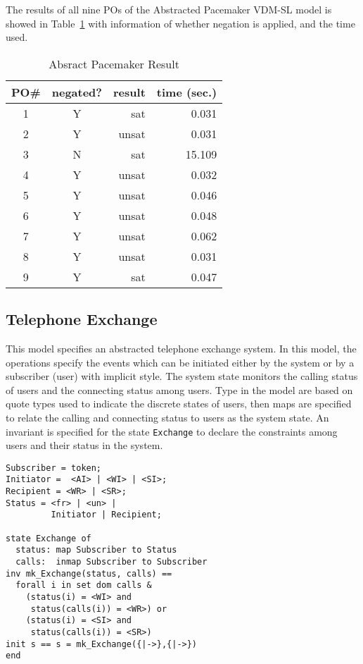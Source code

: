 The results of all nine POs of the Abstracted Pacemaker VDM-SL model is showed in Table~\ref{tbl:result1} with information of whether negation is applied, and the time used.

\begin{table}[htb]
\begin{center}
\begin{tabular}{|c|c|r|r|}
\hline
PO\#	&	negated?	&	result	&	time (sec.) \\ \hline
1		&	Y			&	sat		&	0.031 \\ \hline
2		&	Y			&	unsat	&	0.031 \\ \hline
3		&	N			&	sat		&	15.109 \\ \hline
4		&	Y			&	unsat	&	0.032 \\ \hline
5		&	Y			&	unsat	&	0.046 \\ \hline
6		&	Y			&	unsat	&	0.048 \\ \hline
7		&	Y			&	unsat	&	0.062 \\ \hline
8		&	Y			&	unsat	&	0.031 \\ \hline
9		&	Y			&	sat		&	0.047 \\ \hline
\end{tabular}
\end{center}
\caption{Absract Pacemaker Result}
\label{tbl:result1}
\end{table}


\subsection{Telephone Exchange}

This model specifies an abstracted telephone exchange system. In this model, the operations specify the events which can be initiated either by the system or by a subscriber (user) with implicit style. The system state monitors the calling status of users and the connecting status among users. Type in the model are based on quote types used to indicate the discrete states of users, then maps are specified to relate the calling and connecting status to users as the system state. An invariant is specified for the state {\tt Exchange} to declare the constraints among users and their status in the system.

\begin{mdframed}[roundcorner=5pt]
\begin{Verbatim}[fontsize=\small]
Subscriber = token;
Initiator =  <AI> | <WI> | <SI>;
Recipient = <WR> | <SR>;
Status = <fr> | <un> |
         Initiator | Recipient;
                                                                      
state Exchange of
  status: map Subscriber to Status
  calls:  inmap Subscriber to Subscriber
inv mk_Exchange(status, calls) == 
  forall i in set dom calls & 
    (status(i) = <WI> and
     status(calls(i)) = <WR>) or
    (status(i) = <SI> and
     status(calls(i)) = <SR>)
init s == s = mk_Exchange({|->},{|->})
end
\end{Verbatim}
\end{mdframed}

